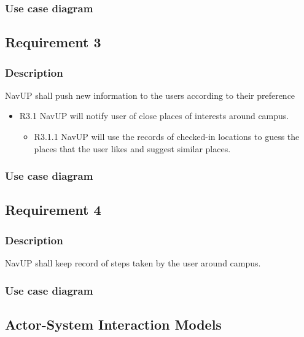 \documentclass{article}
\begin{document}
        \subsubsection{Use case diagram}
        \subsection{Requirement 3}
        \subsubsection{Description}
        NavUP shall push new information to the users according to their preference
        \begin{itemize}
        \item R3.1 NavUP will notify user of close places of interests around campus.
        \begin{itemize}
        \item R3.1.1 NavUP will use the records of checked-in locations to guess the places that the user likes and suggest similar places. 
        \end{itemize}
        \end{itemize}
        \subsubsection{Use case diagram}
        \pagebreak
        \subsection{Requirement 4}
        \subsubsection{Description}
        NavUP shall keep record of steps taken by the user around campus.
        \subsubsection{Use case diagram}
        
        \subsection{Actor-System Interaction Models}
			
\end{document}
